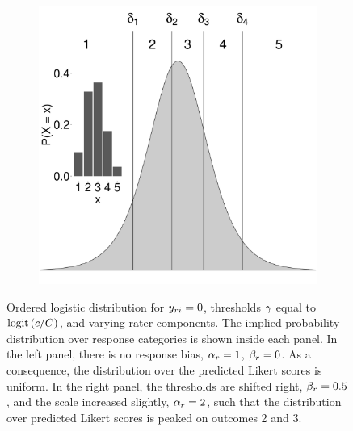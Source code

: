 \documentclass[a4paper,usenames,dvipsnames]{article}
\begin{document}
\begin{figure}[!ht]
\begin{subfigure}{.5\textwidth}
		\includegraphics[width=.97\textwidth]{figures/orderedLogisticBiased.pdf}
	\end{subfigure}
	\caption{Ordered logistic distribution for $y_{ri} = 0$, thresholds $\gamma$ equal to $\text{logit}\left(c/C\right)$, and varying rater components. The implied probability distribution over response categories is shown inside each panel. In the left panel, there is no response bias, $\alpha_r = 1$, $\beta_r = 0$. As a consequence, the distribution over the predicted Likert scores is uniform. In the right panel, the thresholds are shifted right, $\beta_r = 0.5$, and the scale increased slightly, $\alpha_r = 2$, such that the distribution over predicted Likert scores is peaked on outcomes 2 and 3.}
	\label{fig:orderedLogistic}
\end{figure}
\end{document}
